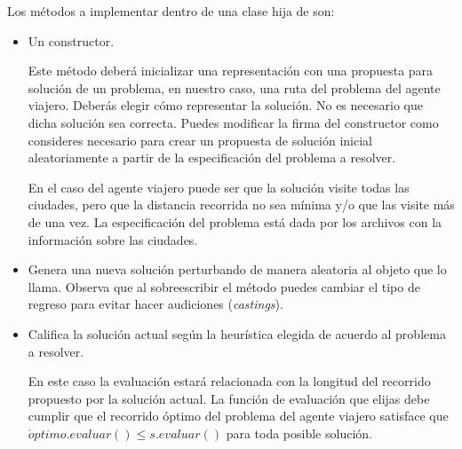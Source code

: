 Los métodos a implementar dentro de una clase hija de  son:
\begin{itemize}
 \item Un constructor.
 
 Este método deberá inicializar una representación con una propuesta para solución de un problema, en nuestro caso, una ruta del problema del agente viajero.  Deberás elegir cómo representar la solución.  No es necesario que dicha solución sea correcta.  Puedes modificar la firma del constructor como consideres necesario para crear un propuesta de solución inicial aleatoriamente a partir de la especificación del problema a resolver.
 
 En el caso del agente viajero puede ser que la solución visite todas las ciudades, pero que la distancia recorrida no sea mínima y/o que las visite más de una vez.  La especificación del problema está dada por los archivos  con la información sobre las ciudades.
 
 \item {}
 
 Genera una nueva solución perturbando de manera aleatoria al objeto que lo llama.  Observa que al sobreescribir el método puedes cambiar el tipo de regreso para evitar hacer audiciones (\textit{castings}).
 
 \item {}
 
 Califica la solución actual según la heurística elegida de acuerdo al problema a resolver.
 
 En este caso la evaluación estará relacionada con la longitud del recorrido propuesto por la solución actual.  La función de evaluación que elijas debe cumplir que el recorrido óptimo del problema del agente viajero satisface que $\acute{o}ptimo.evaluar() \leq s.evaluar()$ para toda posible solución.
\end{itemize}


